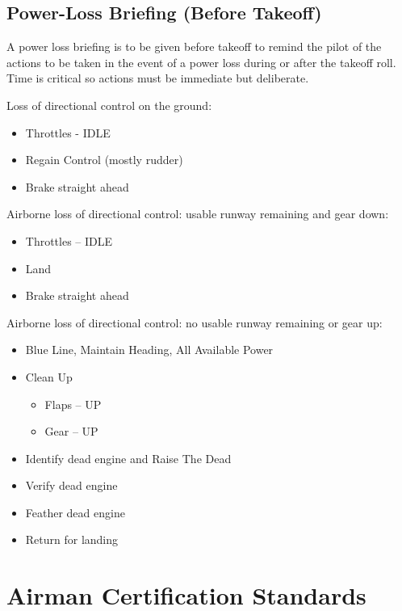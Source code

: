 \subsection{Power-Loss Briefing (Before Takeoff)}

A power loss briefing is to be given before takeoff to remind the pilot of the actions to be taken in the event of a
power loss during or after the takeoff roll. Time is critical so actions must be immediate but deliberate.

\bfseries{

Loss of directional control on the ground:
\begin{itemize}
    \item Throttles - IDLE
    \item Regain Control (mostly rudder)
    \item Brake straight ahead
\end{itemize}

Airborne loss of directional control: usable runway remaining and gear down:
\begin{itemize}
    \item Throttles – IDLE
    \item Land
    \item Brake straight ahead
\end{itemize}

Airborne loss of directional control: no usable runway remaining or gear up:
\begin{itemize}
    \item Blue Line, Maintain Heading, All Available Power
    \item Clean Up
        \begin{itemize}
            \item[\ding{226}] Flaps – UP
            \item[\ding{226}] Gear – UP
        \end{itemize}
    \item Identify dead engine and Raise The Dead
    \item Verify dead engine
    \item Feather dead engine
    \item Return for landing
\end{itemize}
\mdseries

\section{Airman Certification Standards}

}
